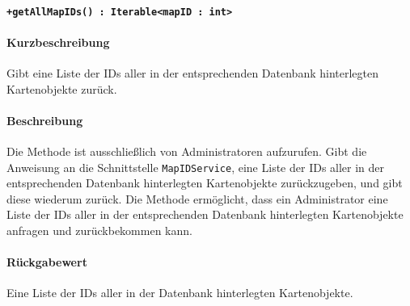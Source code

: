 \paragraph*{\texttt{+getAllMapIDs() : Iterable<mapID : int>}}%
\paragraph*{Kurzbeschreibung}
Gibt eine Liste der IDs aller in der entsprechenden Datenbank hinterlegten Kartenobjekte zurück.
\paragraph*{Beschreibung}
Die Methode ist ausschließlich von Administratoren aufzurufen.
Gibt die Anweisung an die Schnittstelle \texttt{MapIDService}, eine Liste der IDs aller in der entsprechenden Datenbank hinterlegten Kartenobjekte zurückzugeben, und gibt diese wiederum zurück.
Die Methode ermöglicht, dass ein Administrator eine Liste der IDs aller in der entsprechenden Datenbank hinterlegten Kartenobjekte anfragen und zurückbekommen kann.
\paragraph*{Rückgabewert}
Eine Liste der IDs aller in der Datenbank hinterlegten Kartenobjekte.
